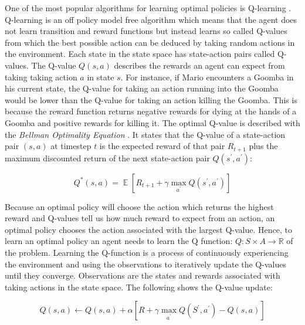 \documentclass[notitlepage,a4paper,11pt]{article}
\newcommand{\R}{\mathbb{R}}
\DeclareMathOperator{\E}{\mathbb{E}}
\begin{document}
One of the most popular algorithms for learning optimal policies is Q-learning \cite{watkins1992q}. Q-learning is an off policy model free algorithm which means that the agent does not learn transition and reward functions but instead learns so called Q-values from which the best possible action can be deduced by taking random actions in the environment. Each state in the state space has state-action pairs called Q-values. The Q-value $Q(s,a)$ describes the rewards an agent can expect from taking taking action $a$ in state $s$. For instance, if Mario encounters a Goomba in his current state, the Q-value for taking an action running into the Goomba would be lower than the Q-value for taking an action killing the Goomba. This is because the reward function returns negative rewards for dying at the hands of a Goomba and positive rewards for killing it. The optimal Q-value is described with the \textit{Bellman Optimality Equation} \cite{bellman1966dynamic}. It states that the Q-value of a state-action pair $(s,a)$ at timestep $t$ is the expected reward of that pair $R_{t+1}$ plus the maximum discounted return of the next state-action pair $Q(s^\prime, a^\prime)$:


\begin{equation}\label{eq:optimal_q}
Q^*(s,a) = \E \left[ R_{t+1} + \gamma \max\limits_{a^\prime} Q(s^\prime, a^\prime) \right]
\end{equation}


Because an optimal policy will choose the action which returns the highest reward and Q-values tell us how much reward to expect from an action, an optimal policy chooses the action associated with the largest Q-value. Hence, to learn an optimal policy an agent needs to learn the Q function: $Q : S \times A \to \R$ of the problem. Learning the Q-function is a process of continuously experiencing the environment and using the observations to iteratively update the Q-values until they converge. Observations are the states and rewards associated with taking actions in the state space. The following shows the Q-value update:

\begin{equation} \label{eq:q_update}
	Q(s,a) \gets Q(s,a) + \alpha \left[ R + \gamma \max\limits_{a^\prime} Q(S^\prime, a^\prime) - Q(s,a) \right]
\end{equation}
\end{document}
